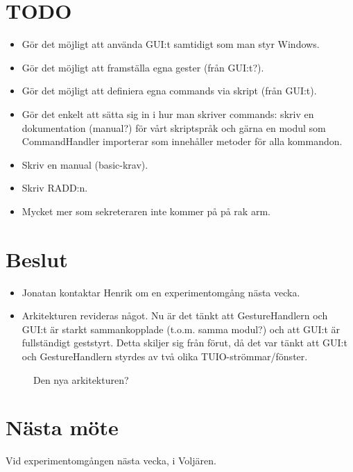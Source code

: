 \documentclass[a4paper,12pt]{article}
\begin{document}
\section{TODO}
\begin{itemize}
\item Gör det möjligt att använda GUI:t samtidigt som man styr Windows.
\item Gör det möjligt att framställa egna gester (från GUI:t?).
\item Gör det möjligt att definiera egna commands via skript (från GUI:t).
\item Gör det enkelt att sätta sig in i hur man skriver commands: skriv en dokumentation
(manual?) för vårt skriptspråk och gärna en modul som CommandHandler importerar som
innehåller metoder för alla kommandon.
\item Skriv en manual (basic-krav).
\item Skriv RADD:n.
\item Mycket mer som sekreteraren inte kommer på på rak arm.
\end{itemize}

\section{Beslut}
\begin{itemize}
\item Jonatan kontaktar Henrik om en experimentomgång nästa vecka.
\item Arkitekturen revideras något. Nu är det tänkt att GestureHandlern och GUI:t är starkt
sammankopplade (t.o.m. samma modul?) och att GUI:t är fullständigt geststyrt. Detta skiljer sig
från förut, då det var tänkt att GUI:t och GestureHandlern styrdes av två olika
TUIO-strömmar/fönster.
\end{itemize}

\begin{figure}
\caption{Den nya arkitekturen?}
\end{figure}

\section{Nästa möte}
Vid experimentomgången nästa vecka, i Voljären.
\end{document}
